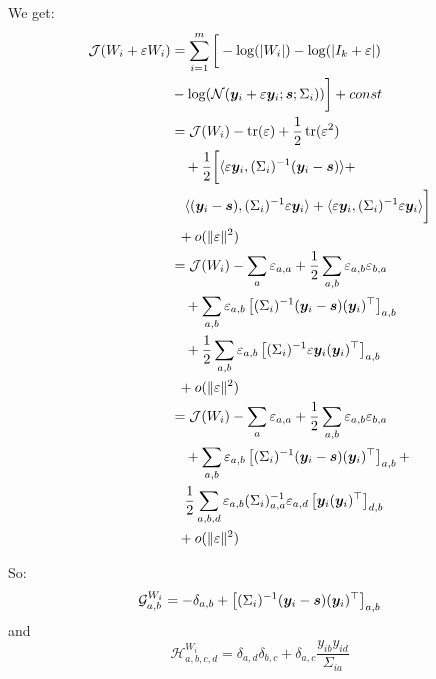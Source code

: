  We get:
 \begin{align}
   \mathcal{J}(W_i + \varepsilon W_i) &= \sum_{i=1}^m \bigg[ -\log(|W_i|) -\log(|I_k + \varepsilon|) \nonumber \\&- \log(\mathcal{N}(\boldsymbol{y}_i + \varepsilon \boldsymbol{y}_i; \boldsymbol{s}; \Sigma_i)) \bigg] + const \\
                                      &= \mathcal{J}(W_i) - \mathop{\mathrm{tr}}(\varepsilon) + \frac12 \mathop{\mathrm{tr}}(\varepsilon^2) \nonumber \\& \enspace \enspace + \frac12 \bigg[\langle{ \varepsilon \boldsymbol{y}_i},{ (\Sigma_i)^{-1} (\boldsymbol{y}_i - \boldsymbol{s}) }\rangle + \nonumber \\& \enspace \enspace \langle{ (\boldsymbol{y}_i - \boldsymbol{s})},{ (\Sigma_i)^{-1} \varepsilon \boldsymbol{y}_i }\rangle + \langle{ \varepsilon \boldsymbol{y}_i},{ (\Sigma_i)^{-1} \varepsilon \boldsymbol{y}_i }\rangle \bigg] \nonumber \\ & \enspace + o(\|\varepsilon\|^2) \\
                                      &= \mathcal{J}(W_i) - \sum_a \varepsilon_{a, a} + \frac12 \sum_{a, b} \varepsilon_{a,b} \varepsilon_{b, a} \nonumber \\& \enspace \enspace + \sum_{a, b} \varepsilon_{a, b} \left[(\Sigma_i)^{-1}(\boldsymbol{y}_i - \boldsymbol{s}) (\boldsymbol{y}_i)^{\top} \right]_{a, b} \nonumber \\& \enspace \enspace + \frac12 \sum_{a, b} \varepsilon_{a, b} \left[(\Sigma_i)^{-1} \varepsilon \boldsymbol{y}_i (\boldsymbol{y}_i)^{\top}\right]_{a, b} \nonumber \\ & \enspace + o(\|\varepsilon\|^2) \\
                                      &= \mathcal{J}(W_i) - \sum_a \varepsilon_{a, a} + \frac12 \sum_{a, b} \varepsilon_{a,b} \varepsilon_{b, a} \nonumber \\& \enspace \enspace + \sum_{a, b} \varepsilon_{a, b} \left[(\Sigma_i)^{-1}(\boldsymbol{y}_i - \boldsymbol{s}) (\boldsymbol{y}_i)^{\top} \right]_{a, b} + \nonumber \\& \enspace \enspace \frac12 \sum_{a, b, d} \varepsilon_{a, b} (\Sigma_i)^{-1}_{a, a} \varepsilon_{a, d} \left[\boldsymbol{y}_i (\boldsymbol{y}_i)^{\top}\right]_{d, b} \nonumber \\ & \enspace + o(\|\varepsilon\|^2)
 \end{align}

 So:
 \begin{equation}
 \mathcal{G}^{W_i}_{a, b} =  -\delta_{a,b} + \left[(\Sigma_i)^{-1} (\boldsymbol{y}_i - \boldsymbol{s})(\boldsymbol{y}_i)^{\top}\right]_{a, b}
 \end{equation}
 and
 \begin{equation}
 \mathcal{H}^{W_i}_{a, b, c, d} = \delta_{a, d}\delta_{b, c} + \delta_{a, c} \frac{y_{ib} y_{id}}{\Sigma_{ia}}
 \end{equation}
 
